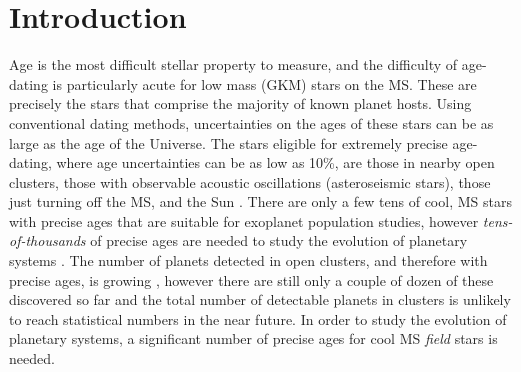 \section{Introduction}
\label{section:intro}

Age is the most difficult stellar property to measure, and the difficulty of
age-dating is particularly acute for low mass (GKM) stars on the MS.
These are precisely the stars that comprise the majority of known planet
hosts.
Using conventional dating methods, uncertainties on the ages of these stars
can be as large as the age of the Universe.
The stars eligible for extremely precise age-dating, where age uncertainties
can be as low as 10\%, are those in nearby open clusters, those with
observable acoustic oscillations (asteroseismic stars), those just turning off
the MS, and the Sun \citep[see][for a review of stellar ages]{soderblom2010}.
There are only a few tens of cool, MS stars with precise ages that are
suitable for exoplanet population studies, however {\it tens-of-thousands} of
precise ages are needed to study the evolution of planetary systems
\citep[\eg][]{petigura2013, foreman-mackey2014, veras2015, burke2015}.
The number of planets detected in open clusters, and therefore with precise
ages, is growing \citep[\eg][]{mann2017, rizzuto2018, vanderburg2018,
mann2018}, however there are still only a couple of dozen of these discovered
so far and the total number of detectable planets in clusters is unlikely to
reach statistical numbers in the near future.
In order to study the evolution of planetary systems, a significant number of
precise ages for cool MS {\it field} stars is needed.

